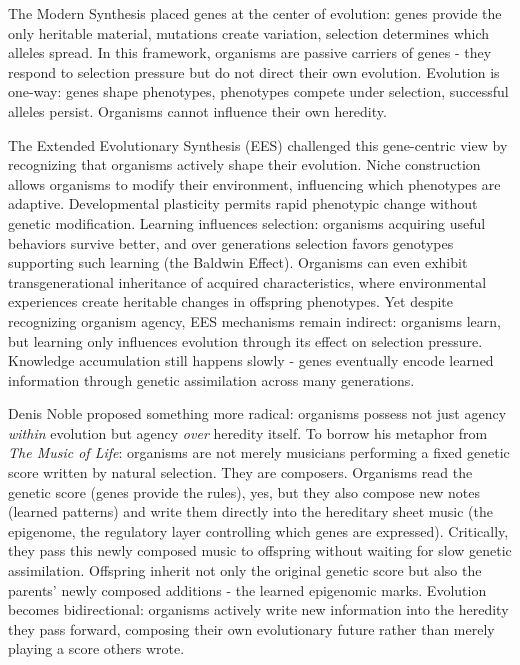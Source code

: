\documentclass[11pt]{article}
\begin{document}
The Modern Synthesis placed genes at the center of evolution: genes provide the only heritable material, mutations create variation, selection determines which alleles spread\citep{Darwin1859,Huxley1942}. In this framework, organisms are passive carriers of genes - they respond to selection pressure but do not direct their own evolution. Evolution is one-way: genes shape phenotypes, phenotypes compete under selection, successful alleles persist. Organisms cannot influence their own heredity.

The Extended Evolutionary Synthesis (EES) challenged this gene-centric view by recognizing that organisms actively shape their evolution\citep{LalandEtAl2015,Uller2015,WestEberhard2003}. Niche construction allows organisms to modify their environment, influencing which phenotypes are adaptive\citep{OdlingSmee2003}. Developmental plasticity permits rapid phenotypic change without genetic modification\citep{WestEberhard2003}. Learning influences selection: organisms acquiring useful behaviors survive better, and over generations selection favors genotypes supporting such learning (the Baldwin Effect)\citep{Baldwin1896,HintonNowlan1987}. Organisms can even exhibit transgenerational inheritance of acquired characteristics, where environmental experiences create heritable changes in offspring phenotypes\citep{JablonkaLamb2005}. Yet despite recognizing organism agency, EES mechanisms remain indirect: organisms learn, but learning only influences evolution through its effect on selection pressure. Knowledge accumulation still happens slowly - genes eventually encode learned information through genetic assimilation across many generations\citep{Waddington1942}.

Denis Noble proposed something more radical: organisms possess not just agency \textit{within} evolution but agency \textit{over} heredity itself\citep{Noble2016,Noble2017,Noble2021}. To borrow his metaphor from \textit{The Music of Life}: organisms are not merely musicians performing a fixed genetic score written by natural selection. They are composers. Organisms read the genetic score (genes provide the rules), yes, but they also compose new notes (learned patterns) and write them directly into the hereditary sheet music (the epigenome, the regulatory layer controlling which genes are expressed). Critically, they pass this newly composed music to offspring without waiting for slow genetic assimilation. Offspring inherit not only the original genetic score but also the parents' newly composed additions - the learned epigenomic marks. Evolution becomes bidirectional: organisms actively write new information into the heredity they pass forward, composing their own evolutionary future rather than merely playing a score others wrote.
\end{document}

